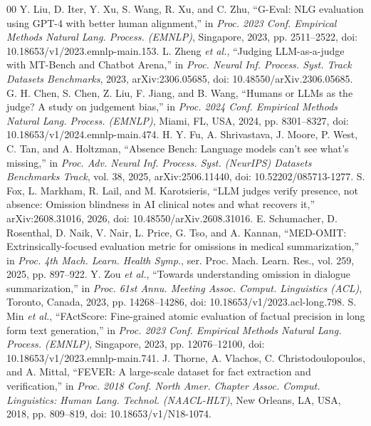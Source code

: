 \documentclass{ieeeaccess}
\begin{document}

\begin{thebibliography}{00}
 Y. Liu, D. Iter, Y. Xu, S. Wang, R. Xu, and C. Zhu, ``G-Eval: NLG evaluation using GPT-4 with better human alignment,'' in \emph{Proc. 2023 Conf. Empirical Methods Natural Lang. Process. (EMNLP)}, Singapore, 2023, pp. 2511--2522, doi: 10.18653/v1/2023.emnlp-main.153.
 L. Zheng \emph{et al.}, ``Judging LLM-as-a-judge with MT-Bench and Chatbot Arena,'' in \emph{Proc. Neural Inf. Process. Syst. Track Datasets Benchmarks}, 2023, arXiv:2306.05685, doi: 10.48550/arXiv.2306.05685.
 G. H. Chen, S. Chen, Z. Liu, F. Jiang, and B. Wang, ``Humans or LLMs as the judge? A study on judgement bias,'' in \emph{Proc. 2024 Conf. Empirical Methods Natural Lang. Process. (EMNLP)}, Miami, FL, USA, 2024, pp. 8301--8327, doi: 10.18653/v1/2024.emnlp-main.474.
 H. Y. Fu, A. Shrivastava, J. Moore, P. West, C. Tan, and A. Holtzman, ``Absence Bench: Language models can't see what's missing,'' in \emph{Proc. Adv. Neural Inf. Process. Syst. (NeurIPS) Datasets Benchmarks Track}, vol. 38, 2025, arXiv:2506.11440, doi: 10.52202/085713-1277.
 S. Fox, L. Markham, R. Lail, and M. Karotsieris, ``LLM judges verify presence, not absence: Omission blindness in AI clinical notes and what recovers it,'' arXiv:2608.31016, 2026, doi: 10.48550/arXiv.2608.31016.
 E. Schumacher, D. Rosenthal, D. Naik, V. Nair, L. Price, G. Tso, and A. Kannan, ``MED-OMIT: Extrinsically-focused evaluation metric for omissions in medical summarization,'' in \emph{Proc. 4th Mach. Learn. Health Symp.}, ser. Proc. Mach. Learn. Res., vol. 259, 2025, pp. 897--922.
 Y. Zou \emph{et al.}, ``Towards understanding omission in dialogue summarization,'' in \emph{Proc. 61st Annu. Meeting Assoc. Comput. Linguistics (ACL)}, Toronto, Canada, 2023, pp. 14268--14286, doi: 10.18653/v1/2023.acl-long.798.
 S. Min \emph{et al.}, ``FActScore: Fine-grained atomic evaluation of factual precision in long form text generation,'' in \emph{Proc. 2023 Conf. Empirical Methods Natural Lang. Process. (EMNLP)}, Singapore, 2023, pp. 12076--12100, doi: 10.18653/v1/2023.emnlp-main.741.
 J. Thorne, A. Vlachos, C. Christodoulopoulos, and A. Mittal, ``FEVER: A large-scale dataset for fact extraction and verification,'' in \emph{Proc. 2018 Conf. North Amer. Chapter Assoc. Comput. Linguistics: Human Lang. Technol. (NAACL-HLT)}, New Orleans, LA, USA, 2018, pp. 809--819, doi: 10.18653/v1/N18-1074.

\end{thebibliography}
\end{document}
